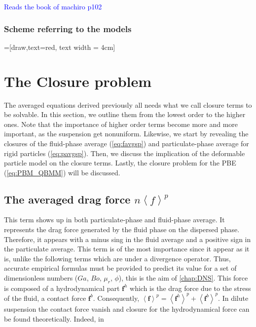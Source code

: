 \textcolor{blue}{Reads the book of machiro p102}
\citet{randolph2012theory}

\subsubsection*{Scheme referring to the models}

=[draw,text=red, text width = 4cm]







\section{The Closure problem}
\label{sec:closure}
The averaged equations derived previously all needs what we call closure terms to be solvable. 
In this section, we outline them from the lowest order to the higher ones.
Note that the importance of higher order terms become more and more important, as the suspension get nonuniform. 
Likewise, we start by revealing the closures of the fluid-phase average (\ref{eq:favgsp}) and particulate-phase average for rigid particles (\ref{eq:pavgsp}). 
Then, we discuss the implication of the deformable particle model on the closure terms. 
Lastly, the closure problem for the PBE (\ref{eq:PBM_QBMM}) will be discussed. 


\subsection{The averaged drag force $n\left<f\right>^p$}
This term shows up in both particulate-phase and fluid-phase average. 
It represents the drag force generated by the fluid phase on the dispersed phase.
Therefore, it appears with a minus sing in the fluid average and a positive sign in the particulate average.  
This term is of the most importance since it appear as it is, unlike the following terms which are under a divergence operator. 
Thus, accurate empirical formulas must be provided to predict its value for a set of dimensionless numbers ($Ga$, $Bo$, $\mu_r$, $\phi$), this is the aim of \ref{chap:DNS}. 
This force is composed of a hydrodynamical part $\bm{f}^h$ which is the drag force due to the stress of the fluid, a contact force $\bm{f}^{b}$.
Consequently, $\left<\bm{f}\right>^p=\left<\bm{f}^h\right>^p+\left<\bm{f}^b\right>^p$.
In dilute suspension the contact force vanish and closure for the hydrodynamical force can be found theoretically. 
Indeed, in 

